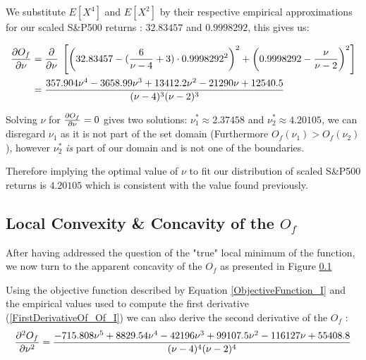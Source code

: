 We substitute $E\left[X^4\right]$ and $E\left[X^2\right]$ by their respective empirical approximations for our scaled S\&P500 returns : $32.83457$ and $0.9998292$, this gives us:

\begin{align}\label{FirstDerivativeOf_Of_I}
    \begin{split}
        \pdv{O_f}{\nu} &= \pdv{\nu} \; \left[ \left(32.83457 - (\frac{6}{\nu-4} + 3) \cdot
                            0.9998292^2 \right)^2 + \left(0.9998292 - \frac{\nu}{\nu - 2}\right)^2 \right] \\
                        &= \frac{357.904 \nu^4 - 3658.99 \nu^3 + 13412.2 \nu^2 - 21290 \nu + 12540.5}{(\nu - 4)^3 (\nu - 2)^3}
    \end{split}
\end{align}


Solving $\nu$ for  $\pdv{O_f}{\nu}=0$ gives two solutions: $\nu_1^* \approx 2.37458$ and $\nu_2^* \approx 4.20105$, we can disregard $\nu_1$ as it is not part of the set domain (Furthermore $O_f(\nu_1) > O_f(\nu_2)$), however $\nu_2^*$ \emph{is} part of our domain and is not one of the boundaries. \smallskip
\par
Therefore implying the optimal value of $\nu$ to fit our distribution of scaled S\&P500 returns is $4.20105$ which is consistent with the value found previously.

\subsection{Local Convexity \& Concavity of the $O_f$}

After having addressed the question of the "true" local minimum of the function, we now turn to the apparent concavity of the $O_f$ as presented in Figure \ref{} \bigskip\par
Using the objective function described by Equation \ref{ObjectiveFunction_I} and the empirical values used to compute the first derivative (\ref{FirstDerivativeOf_Of_I}) we can also derive the second derivative of the $O_f$ :
\begin{equation}\label{SecondDerivativeOf_Of_I}
    \pdv[2]{O_f}{\nu} =  \frac{-715.808 \nu^5 + 8829.54 \nu^4 - 42196 \nu^3 + 99107.5 \nu^2 - 116127 \nu + 55408.8}{(\nu - 4)^4 (\nu - 2)^4}
\end{equation}

